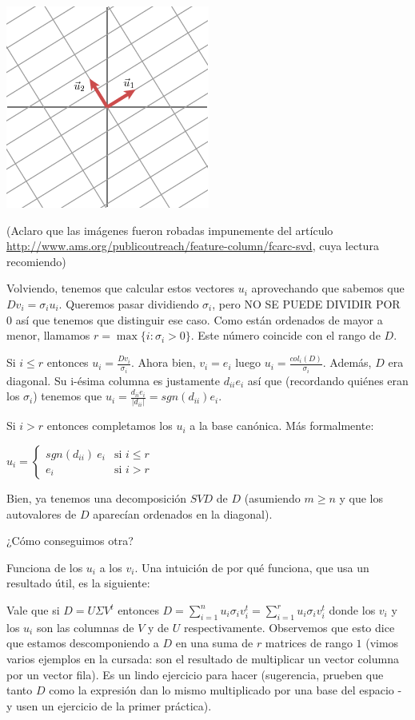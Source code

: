 \documentclass[10pt,a4paper,final]{article}
\begin{document}
\includegraphics{SVD2.png}

(Aclaro que las imágenes fueron robadas impunemente del artículo \url{http://www.ams.org/publicoutreach/feature-column/fcarc-svd}, cuya lectura recomiendo)

Volviendo, tenemos que calcular estos vectores $u_i$ aprovechando que sabemos que $D v_i = \sigma_i u_i$. Queremos pasar dividiendo $\sigma_i$, pero NO SE PUEDE DIVIDIR POR $0$ así que tenemos que distinguir ese caso. Como están ordenados de mayor a menor, llamamos $r = \max\{i : \sigma_i > 0\}$. Este número coincide con el rango de $D$.

Si $i\leq r$ entonces $u_i = \frac{D v_i}{\sigma_i}$. Ahora bien, $v_i = e_i$ luego $u_i = \frac{col_i(D)}{\sigma_i}$. Además, $D$ era diagonal. Su i-ésima columna es justamente $d_{ii} e_i$ así que (recordando quiénes eran los $\sigma_i$) tenemos que $u_i = \frac{d_{ii} e_i}{|d_{ii}|} = sgn(d_{ii}) e_i$.

Si $i>r$ entonces completamos los $u_i$ a la base canónica. Más formalmente:

$u_i =
    \begin{cases}
        sgn(d_{ii})\ e_i  & \text{si $i\leq r$} \\
       e_i & \text{si $i>r$}
    \end{cases}$

Bien, ya tenemos una decomposición $SVD$ de $D$ (asumiendo $m \geq n$ y que los autovalores de $D$ aparecían ordenados en la diagonal).

¿Cómo conseguimos otra?

Funciona  de los $u_i$ a los $v_i$. Una intuición de por qué funciona, que usa un resultado útil, es la siguiente:

Vale que si $D = U\Sigma V^t$ entonces $D = \displaystyle\sum_{i=1}^n u_i \sigma_i v_i^t = \sum_{i=1}^r u_i \sigma_i v_i^t$ donde los $v_i$ y los $u_i$ son las columnas de $V$ y de $U$ respectivamente. Observemos que esto dice que estamos descomponiendo a $D$ en una suma de $r$ matrices de rango $1$ (vimos varios ejemplos en la cursada: son el resultado de multiplicar un vector columna por un vector fila). Es un lindo ejercicio para hacer (sugerencia, prueben que tanto $D$ como la expresión dan lo mismo multiplicado por una base del espacio - y usen un ejercicio de la primer práctica).
\end{document}
